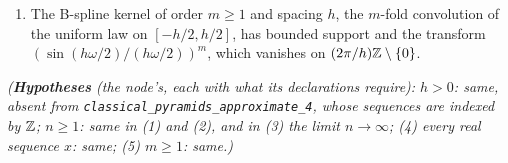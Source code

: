 \begin{proposition}
\begin{enumerate}
smoothed sequence $y := w * x$ and its decimation $z(k) := y(2k)$ on $2h\ZZ$ satisfy
\[
  S^-(z) \le S^-(y) \le S^-(x), \qquad S^-(\Delta z) \le S^-(\Delta y) \le S^-(\Delta x).
\]
\item The B-spline kernel of order $m \ge 1$ and spacing $h$, the $m$-fold convolution of the uniform
law on $[-h/2, h/2]$, has bounded support and the transform $(\sin(h\omega/2)/(h\omega/2))^m$, which
vanishes on $(2\pi/h)\mathbb{Z} \setminus \{0\}$.
\end{enumerate}
\statusT\quad\emph{(\textbf{Hypotheses} (the node's, each with what its declarations require): $h > 0$:
same, absent from \texttt{classical\_pyramids\_approximate\_4}, whose sequences are indexed by
$\mathbb{Z}$; $n \ge 1$: same in (1) and (2), and in (3) the limit $n \to \infty$; (4) every real
sequence $x$: same; (5) $m \ge 1$: same.)}
\end{proposition}

